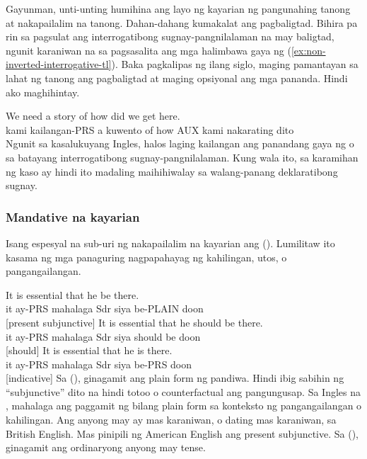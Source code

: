 Gayunman, unti-unting humihina ang layo ng kayarian ng pangunahing tanong at nakapailalim na tanong. Dahan-dahang kumakalat ang pagbaligtad. Bihira pa rin sa pagsulat ang interrogatibong sugnay-pangnilalaman na may baligtad, ngunit karaniwan na sa pagsasalita ang mga halimbawa gaya ng (\ref{ex:non-inverted-interrogative-tl}). Baka pagkalipas ng ilang siglo, maging pamantayan sa lahat ng tanong ang pagbaligtad at maging opsiyonal ang mga pananda. Hindi ako maghihintay.

\ea\label{ex:non-inverted-interrogative-tl}
\gll We need a story of {\ob}how did we get here{\cb}.\\
    kami kailangan-PRS a kuwento of how AUX kami nakarating dito\\
\glt {}
\z
Ngunit sa kasalukuyang Ingles, halos laging kailangan ang panandang gaya ng  o  sa batayang interrogatibong sugnay-pangnilalaman. Kung wala ito, sa karamihan ng kaso ay hindi ito madaling maihihiwalay sa walang-panang deklaratibong sugnay.

\subsubsection*{Mandative na kayarian}

Isang espesyal na sub-uri ng nakapailalim na kayarian ang  (). Lumilitaw ito kasama ng mga panaguring nagpapahayag ng kahilingan, utos, o pangangailangan.

\ea \label{ex:mandative-tl}
    \ea \gll It is essential {\ob}that he be there{\cb}.\\
        it ay-PRS mahalaga Sdr siya be-PLAIN doon\\
    \glt {} [present subjunctive]
    \ex \gll It is essential {\ob}that he should be there{\cb}.\\
        it ay-PRS mahalaga Sdr siya should be doon\\
    \glt {} [should]
    \ex \gll It is essential {\ob}that he is there{\cb}.\\
        it ay-PRS mahalaga Sdr siya be-PRS doon\\
    \glt {} [indicative]
    \z
\z
Sa  (), ginagamit ang plain form ng pandiwa. Hindi ibig sabihin ng \enquote{subjunctive} dito na hindi totoo o counterfactual ang pangungusap. Sa Ingles na , mahalaga ang paggamit ng  bilang plain form sa konteksto ng pangangailangan o kahilingan. Ang anyong may  ay mas karaniwan, o dating mas karaniwan, sa British English. Mas pinipili ng American English ang present subjunctive. Sa  (), ginagamit ang ordinaryong anyong may tense.

